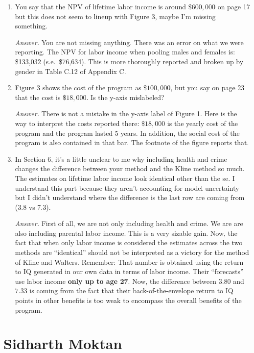 \begin{enumerate}
\item You say that the NPV of lifetime labor income is around $\$600,000$ on page 17 but this does not seem to lineup with Figure 3, maybe I'm missing something.

\noindent \textit{Answer.} You are not missing anything. There was an error on what we were reporting. The NPV for labor income when pooling males and females is: \$133,032 (s.e.\ \$76,634). This is more thoroughly reported and broken up by gender in Table C.12 of Appendix C.

\item Figure 3 shows the cost of the program as $\$100,000$, but you say on page 23 that the cost is $\$18,000$. Is the y-axis mislabeled?

\noindent \textit{Answer.} There is not a mistake in the y-axis label of Figure 1. Here is the way to interpret the costs reported there: $\$18,000$ is the yearly cost of the program and the program lasted 5 years. In addition, the social cost of the program is also contained in that bar. The footnote of the figure reports that.

\item In Section 6, it's a little unclear to me why including health and crime changes the difference between your method and the Kline method so much.  The estimates on lifetime labor income look identical other than the se.  I understand this part because they aren't accounting for model uncertainty but I didn't understand where the difference is the last row are coming from (3.8 vs 7.3).

\noindent \textit{Answer.} First of all, we are not only including health and crime. We are are also including parental labor income. This is a very sizable gain. Now, the fact that when only labor income is considered the estimates across the two methods are ``identical'' should not be interpreted as a victory for the method of Kline and Walters. Remember: That number is obtained using the return to IQ generated in our own data in terms of labor income. Their ``forecasts'' use labor income \textbf{only up to age 27}. Now, the difference between $3.80$ and $7.33$ is coming from the fact that their back-of-the-envelope return to IQ points in other benefits is too weak to encompass the overall benefits of the program.
\end{enumerate}

\section*{Sidharth Moktan}

